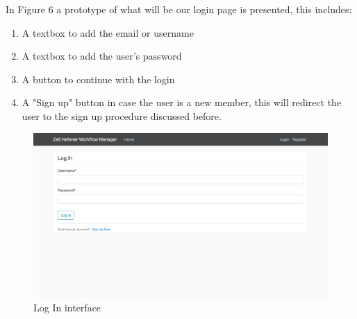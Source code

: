 \documentclass{article}[draft]
\begin{document}
In Figure 6 a prototype of what will be our login page is presented, this includes:
\begin{enumerate}
    \item A textbox to add the email or username
    \item A textbox to add the user's password
    \item A button to continue with the login
    \item A "Sign up" button in case the user is a new member, this will redirect the user to the sign up procedure discussed before.
  \end{enumerate}
  \begin{figure}[h!]
      \centering
      \includegraphics[width=1\columnwidth]{Images/LogIn.jpg}
      \caption{Log In interface}
      \label{fig:figure 4}
  \end{figure}

\vspace{150}
\end{document}
